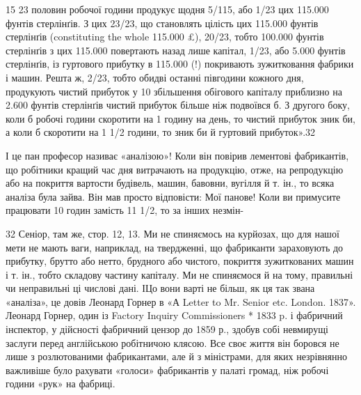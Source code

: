 15%
23 половин робочої години продукує щодня 5/115, або 1/23 цих 115.000 фунтів стерлінґів. З цих 23/23,
що становлять цілість цих 115.000 фунтів стерлінґів (constituting the whole 115.000 £), 20/23, тобто
100.000 фунтів стерлінґів з цих 115.000 повертають назад лише капітал, 1/23, або 5.000 фунтів
стерлінґів, із гуртового прибутку в 115.000 (!) покривають зужитковання фабрики і машин. Решта ж,
2/23, тобто обидві останні півгодини кожного дня, продукують чистий прибуток
у 10%
збільшення обігового
капіталу приблизно на 2.600 фунтів стерлінґів чистий прибуток більше ніж подвоївся б. З другого
боку, коли б робочі години скоротити на 1 годину на день, то чистий прибуток зник би, а коли б
скоротити на 1 1/2 години, то зник би й гуртовий прибуток».32

І це пан професор називає «аналізою»! Коли він повірив лементові фабрикантів, що робітники кращий
час дня витрачають
на продукцію, отже, на репродукцію або на покриття вартости будівель, машин, бавовни, вугілля й т.
ін., то всяка аналіза
була зайва. Він мав просто відповісти: Мої панове! Коли ви примусите працювати 10 годин замість 11
1/2, то за інших незмін-

32    Сеніор, там же, стор. 12, 13. Ми не спиняємось на курйозах, що для нашої мети не мають ваги,
наприклад, на твердженні, що фабриканти зараховують до прибутку, брутто або нетто, брудного або
чистого, покриття зужиткованих машин і т. ін., тобто складову частину капіталу. Ми не
спиняємося й на тому, правильні чи неправильні ці числові дані. ІЦо вони
варті не більш, як ця так звана «аналіза», це довів Леонард Горнер в «А Letter to Mr. Senior etc.
London. 1837». Леонард Горнер, один із Factory Inquiry Commissioners * 1833 p. і фабричний
інспектор, у дійсності
фабричний цензор до 1859 р., здобув собі невмирущі заслуги перед англійською робітничою клясою. Все
своє життя він боровся не лише з розлютованими фабрикантами, але й з міністрами, для яких
незрівнянно важливіше було рахувати «голоси» фабрикантів у палаті громад, ніж
робочі години «рук» на фабриці.

